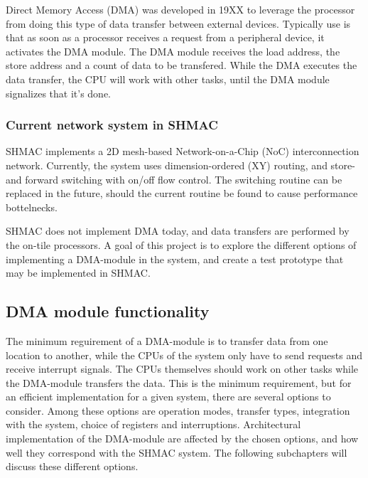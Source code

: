 Direct Memory Access (DMA) was developed in 19XX to leverage the processor from doing this type of data transfer between external devices. Typically use is that as soon as a processor receives a request from a peripheral device, it activates the DMA module. The DMA module receives the load address, the store address and a count of data to be transfered. While the DMA executes the data transfer, the CPU will work with other tasks, until the DMA module signalizes that it's done.

\subsubsection{Current network system in SHMAC}
SHMAC implements a 2D mesh-based Network-on-a-Chip (NoC) interconnection network. 
Currently, the system uses dimension-ordered (XY) routing, and store-and forward switching with on/off flow control. 
The switching routine can be replaced in the future, should the current routine be found to cause performance bottelnecks.

SHMAC does not implement DMA today, and data transfers are performed by the on-tile processors. 
A goal of this project is to explore the different options of implementing a DMA-module in the system, and create a test prototype that may be implemented in SHMAC.

\subsection{DMA module functionality}
The minimum reguirement of a DMA-module is to transfer data from one location to another, while the CPUs of the system only have to send requests and receive interrupt signals.
The CPUs themselves should work on other tasks while the DMA-module transfers the data.
This is the minimum requirement, but for an efficient implementation for a given system, there are several options to consider.
Among these options are operation modes, transfer types, integration with the system, choice of registers and interruptions.
Architectural implementation of the DMA-module are affected by the chosen options, and how well they correspond with the SHMAC system.
The following subchapters will discuss these different options. 


